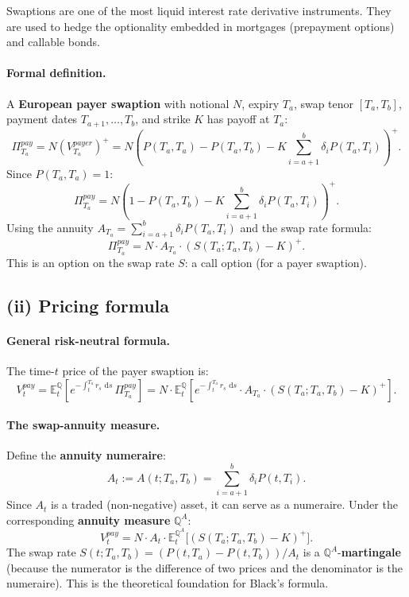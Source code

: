 \documentclass[11pt]{article}
\newcommand{\QQ}{\mathbb{Q}}
\newcommand{\EE}{\mathbb{E}}
\newcommand{\dd}{\,\mathrm{d}}
\begin{document}
Swaptions are one of the most liquid interest rate derivative instruments.
They are used to hedge the optionality embedded in mortgages (prepayment
options) and callable bonds.

\paragraph{Formal definition.}

A \textbf{European payer swaption} with notional $N$, expiry $T_a$, swap
tenor $[T_a,T_b]$, payment dates $T_{a+1},\ldots,T_b$, and strike $K$
has payoff at $T_a$:
\[
\Pi_{T_a}^{pay}
= N\left(V_{T_a}^{payer}\right)^+
= N\!\left(P(T_a,T_a)-P(T_a,T_b)-K\sum_{i=a+1}^b\delta_i P(T_a,T_i)\right)^+.
\]
Since $P(T_a,T_a)=1$:
\[
\Pi_{T_a}^{pay}
= N\left(1-P(T_a,T_b)-K\sum_{i=a+1}^b\delta_i P(T_a,T_i)\right)^+.
\]
Using the annuity $A_{T_a} = \sum_{i=a+1}^b \delta_i P(T_a,T_i)$ and the
swap rate formula:
\[
\Pi_{T_a}^{pay}
= N\cdot A_{T_a}\cdot(S(T_a;T_a,T_b)-K)^+.
\]
This is an option on the swap rate $S$: a call option (for a payer swaption).

\subsection{(ii) Pricing formula}

\paragraph{General risk-neutral formula.}

The time-$t$ price of the payer swaption is:
\[
V_t^{pay}
= \EE_t^\QQ\!\left[
e^{-\int_t^{T_a}r_s\,\dd s}\,\Pi_{T_a}^{pay}
\right]
= N\cdot\EE_t^\QQ\!\left[
e^{-\int_t^{T_a}r_s\,\dd s}\cdot A_{T_a}\cdot(S(T_a;T_a,T_b)-K)^+
\right].
\]

\paragraph{The swap-annuity measure.}  Define the \textbf{annuity numeraire}:
\[
A_t := A(t;T_a,T_b) = \sum_{i=a+1}^b\delta_i P(t,T_i).
\]
Since $A_t$ is a traded (non-negative) asset, it can serve as a numeraire.
Under the corresponding \textbf{annuity measure} $\QQ^A$:
\[
V_t^{pay} = N\cdot A_t\cdot\EE_t^{\QQ^A}\!\big[(S(T_a;T_a,T_b)-K)^+\big].
\]
The swap rate $S(t;T_a,T_b) = (P(t,T_a)-P(t,T_b))/A_t$ is a
$\QQ^A$-\textbf{martingale} (because the numerator is the difference of
two prices and the denominator is the numeraire).  This is the theoretical
foundation for Black's formula.
\end{document}
